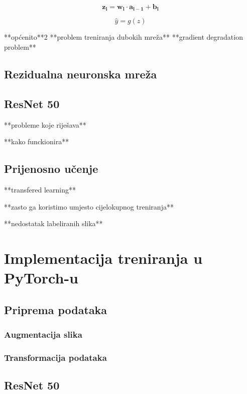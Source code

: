 \documentclass[times, utf8, zavrsni,numeric,pstricks]{fer}
\newcommand{\vect}[1]{\boldsymbol{#1}}
\begin{document}
\begin{equation}\label{eq:neuron_layer}
	\boldsymbol{\vect{z_l}} = \vect{w_l} \cdot \vect{a_{l-1}} + \vect{b_l}
\end{equation}

\begin{equation}\label{eq:neuron}
	\hat{y} = g(z)
\end{equation}



**općenito**2
**problem treniranja dubokih mreža**	
**gradient degradation problem**


\subsection{Rezidualna neuronska mreža}

\subsection{ResNet 50}
**probleme koje riješava**

**kako funckionira**

\subsection{Prijenosno učenje}
**transfered learning**

**zasto ga koristimo umjesto cijelokupnog treniranja**

**nedostatak labeliranih slika**

\section{Implementacija treniranja u PyTorch-u}
\subsection{Priprema podataka}
\subsubsection{Augmentacija slika}
\subsubsection{Transformacija podataka}


\subsection{ResNet 50}
\end{document}
